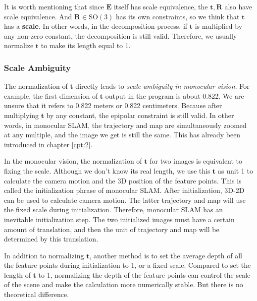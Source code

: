 It is worth mentioning that since $\mathbf{E}$ itself has scale equivalence, the $\mathbf{t}, \mathbf{R}$ also have scale equivalence. And $\mathbf{R} \in \mathrm{SO}(3)$ has its own constraints, so we think that $\mathbf{t}$ has a \textbf{scale}. In other words, in the decomposition process, if $\mathbf{t}$ is multiplied by any non-zero constant, the decomposition is still valid. Therefore, we usually normalize $\mathbf{t}$ to make its length equal to 1.

\subsubsection{Scale Ambiguity}
The normalization of $\mathbf{t}$ directly leads to \textit{scale ambiguity in monocular vision}. For example, the first dimension of $\mathbf{t}$ output in the program is about 0.822. We are unsure that it refers to 0.822 meters or 0.822 centimeters. Because after multiplying $\mathbf{t}$ by any constant, the epipolar constraint is still valid. In other words, in monocular SLAM, the trajectory and map are simultaneously zoomed at any multiple, and the image we get is still the same. This has already been introduced in chapter \ref{cpt:2}.

In the monocular vision, the normalization of $\mathbf{t}$ for two images is equivalent to fixing the scale. Although we don't know its real length, we use this $\mathbf{t}$ as unit 1 to calculate the camera motion and the 3D position of the feature points. This is called the initialization phrase of monocular SLAM. After initialization, 3D-2D can be used to calculate camera motion. The latter trajectory and map will use the fixed scale during initialization. Therefore, monocular SLAM has an inevitable initialization step. The two initialized images must have a certain amount of translation, and then the unit of trajectory and map will be determined by this translation.

In addition to normalizing $\mathbf{t}$, another method is to set the average depth of all the feature points during initialization to 1, or a fixed scale. Compared to set the length of $\mathbf{t}$ to 1, normalizing the depth of the feature points can control the scale of the scene and make the calculation more numerically stable. But there is no theoretical difference.

